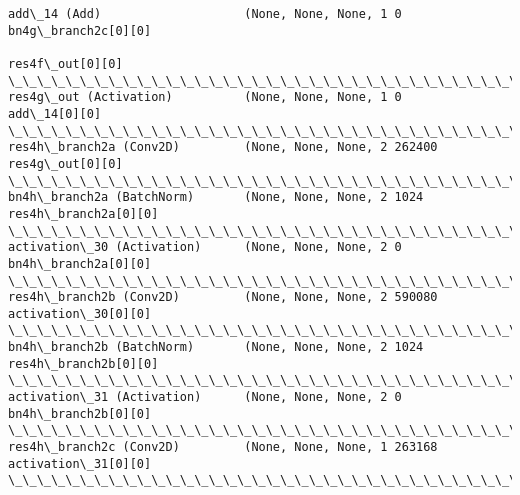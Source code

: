 \documentclass[11pt]{article}
\begin{document}
\begin{Verbatim}[commandchars=\\\{\}]
add\_14 (Add)                    (None, None, None, 1 0           bn4g\_branch2c[0][0]              
                                                                 res4f\_out[0][0]                  
\_\_\_\_\_\_\_\_\_\_\_\_\_\_\_\_\_\_\_\_\_\_\_\_\_\_\_\_\_\_\_\_\_\_\_\_\_\_\_\_\_\_\_\_\_\_\_\_\_\_\_\_\_\_\_\_\_\_\_\_\_\_\_\_\_\_\_\_\_\_\_\_\_\_\_\_\_\_\_\_\_\_\_\_\_\_\_\_\_\_\_\_\_\_\_\_\_\_
res4g\_out (Activation)          (None, None, None, 1 0           add\_14[0][0]                     
\_\_\_\_\_\_\_\_\_\_\_\_\_\_\_\_\_\_\_\_\_\_\_\_\_\_\_\_\_\_\_\_\_\_\_\_\_\_\_\_\_\_\_\_\_\_\_\_\_\_\_\_\_\_\_\_\_\_\_\_\_\_\_\_\_\_\_\_\_\_\_\_\_\_\_\_\_\_\_\_\_\_\_\_\_\_\_\_\_\_\_\_\_\_\_\_\_\_
res4h\_branch2a (Conv2D)         (None, None, None, 2 262400      res4g\_out[0][0]                  
\_\_\_\_\_\_\_\_\_\_\_\_\_\_\_\_\_\_\_\_\_\_\_\_\_\_\_\_\_\_\_\_\_\_\_\_\_\_\_\_\_\_\_\_\_\_\_\_\_\_\_\_\_\_\_\_\_\_\_\_\_\_\_\_\_\_\_\_\_\_\_\_\_\_\_\_\_\_\_\_\_\_\_\_\_\_\_\_\_\_\_\_\_\_\_\_\_\_
bn4h\_branch2a (BatchNorm)       (None, None, None, 2 1024        res4h\_branch2a[0][0]             
\_\_\_\_\_\_\_\_\_\_\_\_\_\_\_\_\_\_\_\_\_\_\_\_\_\_\_\_\_\_\_\_\_\_\_\_\_\_\_\_\_\_\_\_\_\_\_\_\_\_\_\_\_\_\_\_\_\_\_\_\_\_\_\_\_\_\_\_\_\_\_\_\_\_\_\_\_\_\_\_\_\_\_\_\_\_\_\_\_\_\_\_\_\_\_\_\_\_
activation\_30 (Activation)      (None, None, None, 2 0           bn4h\_branch2a[0][0]              
\_\_\_\_\_\_\_\_\_\_\_\_\_\_\_\_\_\_\_\_\_\_\_\_\_\_\_\_\_\_\_\_\_\_\_\_\_\_\_\_\_\_\_\_\_\_\_\_\_\_\_\_\_\_\_\_\_\_\_\_\_\_\_\_\_\_\_\_\_\_\_\_\_\_\_\_\_\_\_\_\_\_\_\_\_\_\_\_\_\_\_\_\_\_\_\_\_\_
res4h\_branch2b (Conv2D)         (None, None, None, 2 590080      activation\_30[0][0]              
\_\_\_\_\_\_\_\_\_\_\_\_\_\_\_\_\_\_\_\_\_\_\_\_\_\_\_\_\_\_\_\_\_\_\_\_\_\_\_\_\_\_\_\_\_\_\_\_\_\_\_\_\_\_\_\_\_\_\_\_\_\_\_\_\_\_\_\_\_\_\_\_\_\_\_\_\_\_\_\_\_\_\_\_\_\_\_\_\_\_\_\_\_\_\_\_\_\_
bn4h\_branch2b (BatchNorm)       (None, None, None, 2 1024        res4h\_branch2b[0][0]             
\_\_\_\_\_\_\_\_\_\_\_\_\_\_\_\_\_\_\_\_\_\_\_\_\_\_\_\_\_\_\_\_\_\_\_\_\_\_\_\_\_\_\_\_\_\_\_\_\_\_\_\_\_\_\_\_\_\_\_\_\_\_\_\_\_\_\_\_\_\_\_\_\_\_\_\_\_\_\_\_\_\_\_\_\_\_\_\_\_\_\_\_\_\_\_\_\_\_
activation\_31 (Activation)      (None, None, None, 2 0           bn4h\_branch2b[0][0]              
\_\_\_\_\_\_\_\_\_\_\_\_\_\_\_\_\_\_\_\_\_\_\_\_\_\_\_\_\_\_\_\_\_\_\_\_\_\_\_\_\_\_\_\_\_\_\_\_\_\_\_\_\_\_\_\_\_\_\_\_\_\_\_\_\_\_\_\_\_\_\_\_\_\_\_\_\_\_\_\_\_\_\_\_\_\_\_\_\_\_\_\_\_\_\_\_\_\_
res4h\_branch2c (Conv2D)         (None, None, None, 1 263168      activation\_31[0][0]              
\_\_\_\_\_\_\_\_\_\_\_\_\_\_\_\_\_\_\_\_\_\_\_\_\_\_\_\_\_\_\_\_\_\_\_\_\_\_\_\_\_\_\_\_\_\_\_\_\_\_\_\_\_\_\_\_\_\_\_\_\_\_\_\_\_\_\_\_\_\_\_\_\_\_\_\_\_\_\_\_\_\_\_\_\_\_\_\_\_\_\_\_\_\_\_\_\_\_

\end{Verbatim}
\end{document}
